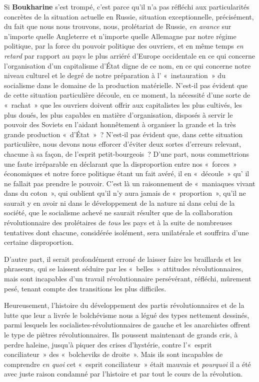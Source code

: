 \documentclass[french,twoside]{book} %
\begin{document}
Si \textbf{Boukharine} s’est trompé, c’est parce qu’il n’a pas réfléchi aux particularités concrètes de la situation actuelle en Russie, situation exceptionnelle, précisément, du fait que nous nous trouvons, nous, prolétariat de Russie, \emph{en avance} sur n’importe quelle Angleterre et n’importe quelle Allemagne par notre régime politique, par la force du pouvoir politique des ouvriers, et en même temps \emph{en retard} par rapport au pays le plus arriéré d’Europe occidentale en ce qui concerne l’organisation d’un capita­lisme d’État digne de ce nom, en ce qui concerne notre niveau culturel et le degré de notre préparation à l’ « instau­ration » du socialisme dans le domaine de la production matérielle. N'est‑il pas évident que de cette situation par­ticulière découle, en ce moment, la nécessité d’une sorte de « rachat » que les ouvriers doivent offrir aux capitalistes les plus cultivés, les plus doués, les plus capables en matière d’organisation, disposés à servir le pouvoir des Soviets en l’aidant honnêtement à organiser la grande et la très grande production « d’État » ? N'est‑il pas évident que, dans cette situation particulière, nous devons nous efforcer d’éviter deux sortes d’erreurs relevant, chacune à sa façon, de l’esprit petit‑bourgeois ? D'une part, nous commettrions une faute irréparable en déclarant que la disproportion entre nos « forces » économiques et notre force politique étant un fait avéré, il en « découle » qu’ il ne fallait pas prendre le pouvoir. C'est là un raisonnement de « maniaques vivant dans du coton », qui oublient qu’il n’y aura jamais de « proportion », qu’il ne saurait y en avoir ni dans le déve­loppement de la nature ni dans celui de la société, que le socialisme achevé ne saurait résulter que de la collaboration révolutionnaire des prolétaires de \emph{tous} les pays et à la suite de nombreuses tentatives dont chacune, considérée isolément, sera unilatérale et souffrira d’une certaine dispropor­tion.\par
D'autre part, il serait profondément erroné de laisser faire les braillards et les phraseurs, qui se laissent séduire par les « belles » attitudes révolutionnaires, mais sont incapables d’un travail révolutionnaire persévérant, réfléchi, mûrement pesé, tenant compte des transitions les plus difficiles.\par
Heureusement, l’histoire du développement des partis révolutionnaires et de la lutte que leur a livrée le bolchévisme nous a légué des types nettement dessinés, parmi lesquels les socialistes‑révolutionnaires de gauche et les anarchistes offrent le type de piètres révolutionnaires. Ils poussent maintenant de grands cris, à perdre haleine, jusqu’à piquer des crises d’hystérie, contre \hspace{1em}l’« esprit conciliateur » des « bolcheviks de droite ». Mais ils sont incapables de comprendre \emph{en quoi} cet « esprit conciliateur » était mauvais et \emph{pourquoi} il a été avec juste raison condamné par l’histoire et par tout le cours de la révolution.\par
\end{document}
